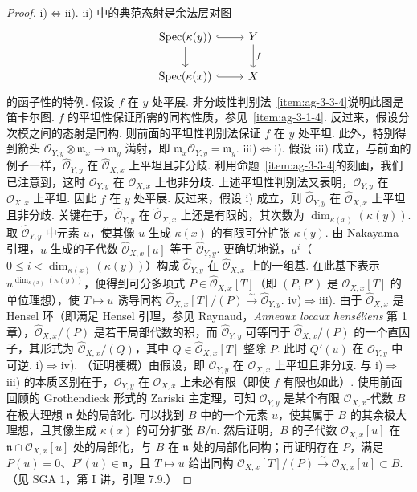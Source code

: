 \begin{proof}
\textup{i)$\Leftrightarrow$ii).} ii) 中的典范态射是余法层对图
\begin{align*}
\begin{tikzcd}[ampersand replacement=\&]
\operatorname{Spec}(\kappa(y))\arrow[r,hook]\arrow[d] \& Y\arrow[d,"f"] \\
\operatorname{Spec}(\kappa(x))\arrow[r,hook] \& X
\end{tikzcd}
\end{align*}
的函子性的特例. 假设 $f$ 在 $y$ 处平展. 非分歧性判别法~\ref{item:ag-3-3-4}说明此图是笛卡尔图. $f$ 的平坦性保证所需的同构性质，参见~\ref{item:ag-3-1-4}. 反过来，假设分次模之间的态射是同构. 则前面的平坦性判别法保证 $f$ 在 $y$ 处平坦. 此外，特别得到箭头 $\mathcal O_{Y,y}\otimes\mathfrak m_x\longrightarrow\mathfrak m_y$ 满射，即 $\mathfrak m_x\mathcal O_{Y,y}=\mathfrak m_y$.
\textup{iii)$\Leftrightarrow$i).} 假设 iii) 成立，与前面的例子一样，$\widehat{\mathcal O}_{Y,y}$ 在 $\widehat{\mathcal O}_{X,x}$ 上平坦且非分歧. 利用命题~\ref{item:ag-3-3-4}的刻画，我们已注意到，这时 $\mathcal O_{Y,y}$ 在 $\mathcal O_{X,x}$ 上也非分歧. 上述平坦性判别法又表明，$\mathcal O_{Y,y}$ 在 $\mathcal O_{X,x}$ 上平坦. 因此 $f$ 在 $y$ 处平展. 反过来，假设 i) 成立，则 $\widehat{\mathcal O}_{Y,y}$ 在 $\widehat{\mathcal O}_{X,x}$ 上平坦且非分歧. 关键在于，$\widehat{\mathcal O}_{Y,y}$ 在 $\widehat{\mathcal O}_{X,x}$ 上还是有限的，其次数为 $\dim_{\kappa(x)}(\kappa(y))$. 取 $\widehat{\mathcal O}_{Y,y}$ 中元素 $u$，使其像 $\bar u$ 生成 $\kappa(x)$ 的有限可分扩张 $\kappa(y)$. 由 Nakayama 引理，$u$ 生成的子代数 $\widehat{\mathcal O}_{X,x}[u]$ 等于 $\widehat{\mathcal O}_{Y,y}$. 更确切地说，$u^i$（$0\leqslant i<\dim_{\kappa(x)}(\kappa(y))$）构成 $\widehat{\mathcal O}_{Y,y}$ 在 $\widehat{\mathcal O}_{X,x}$ 上的一组基. 在此基下表示 $u^{\dim_{\kappa(x)}(\kappa(y))}$，便得到可分多项式 $P\in\widehat{\mathcal O}_{X,x}[T]$（即 $(P,P')$ 是 $\mathcal O_{X,x}[T]$ 的单位理想），使 $T\mapsto u$ 诱导同构 $\widehat{\mathcal O}_{X,x}[T]/(P)\xrightarrow\sim\widehat{\mathcal O}_{Y,y}$.
\textup{iv)$\Rightarrow$iii).} 由于 $\widehat{\mathcal O}_{X,x}$ 是 Hensel 环（即满足 Hensel 引理，参见 Raynaud，\emph{Anneaux locaux henséliens} 第 1 章），$\widehat{\mathcal O}_{X,x}/(P)$ 是若干局部代数的积，而 $\widehat{\mathcal O}_{Y,y}$ 可等同于 $\widehat{\mathcal O}_{X,x}/(P)$ 的一个直因子，其形式为 $\widehat{\mathcal O}_{X,x}/(Q)$，其中 $Q\in\widehat{\mathcal O}_{X,x}[T]$ 整除 $P$. 此时 $Q'(u)$ 在 $\widehat{\mathcal O}_{Y,y}$ 中可逆.
\textup{i)$\Rightarrow$iv).} （证明梗概）由假设，即 $\mathcal O_{Y,y}$ 在 $\mathcal O_{X,x}$ 上平坦且非分歧. 与 i)$\Rightarrow$iii) 的本质区别在于，$\mathcal O_{Y,y}$ 在 $\mathcal O_{X,x}$ 上未必有限（即使 $f$ 有限也如此）. 使用前面回顾的 Grothendieck 形式的 Zariski 主定理，可知 $\mathcal O_{Y,y}$ 是某个有限 $\mathcal O_{X,x}$-代数 $B$ 在极大理想 $\mathfrak n$ 处的局部化. 可以找到 $B$ 中的一个元素 $u$，使其属于 $B$ 的其余极大理想，且其像生成 $\kappa(x)$ 的可分扩张 $B/\mathfrak n$. 然后证明，$B$ 的子代数 $\mathcal O_{X,x}[u]$ 在 $\mathfrak n\cap\mathcal O_{X,x}[u]$ 处的局部化，与 $B$ 在 $\mathfrak n$ 处的局部化同构；再证明存在 $P$，满足 $P(u)=0$、$P'(u)\in\mathfrak n$，且 $T\mapsto u$ 给出同构 $\mathcal O_{X,x}[T]/(P)\xrightarrow\sim\mathcal O_{X,x}[u]\subset B$. （见 SGA 1，第 I 讲，引理 7.9.）
\end{proof}

